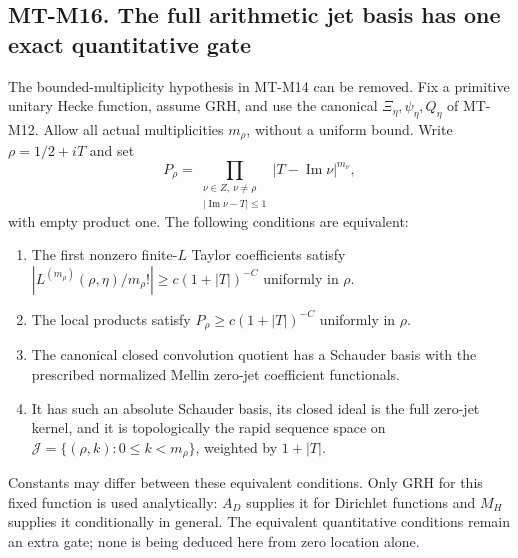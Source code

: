 \subsection*{MT-M16. The full arithmetic jet basis has one exact quantitative gate}
The bounded-multiplicity hypothesis in MT-M14 can be removed.
Fix a primitive unitary Hecke function, assume GRH, and use
the canonical $\Xi_\eta,\psi_\eta,Q_\eta$ of MT-M12.
Allow all actual multiplicities $m_\rho$, without a uniform
bound. Write $\rho=1/2+iT$ and set
\[
 P_\rho=
  \prod_{\substack{\nu\in Z,\ \nu\ne\rho\\
              |\operatorname{Im}\nu-T|\le1}}
              |T-\operatorname{Im}\nu|^{m_\nu},
\]
with empty product one. The following conditions are equivalent:
\begin{enumerate}
\item The first nonzero finite-$L$ Taylor coefficients satisfy
$|L^{(m_\rho)}(\rho,\eta)/m_\rho!|
                       \ge c(1+|T|)^{-C}$ uniformly in $\rho$.
\item The local products satisfy
$P_\rho\ge c(1+|T|)^{-C}$ uniformly in $\rho$.
\item The canonical closed convolution quotient has a
Schauder basis with the prescribed normalized Mellin
zero-jet coefficient functionals.
\item It has such an absolute Schauder basis, its closed
ideal is the full zero-jet kernel, and it is topologically
the rapid sequence space on
$\mathcal J=\{(\rho,k):0\le k<m_\rho\}$, weighted by $1+|T|$.
\end{enumerate}
Constants may differ between these equivalent conditions.
Only GRH for this fixed function is used analytically:
$A_D$ supplies it for Dirichlet functions and $M_H$
supplies it conditionally in general. The equivalent
quantitative conditions remain an extra gate; none is
being deduced here from zero location alone.


